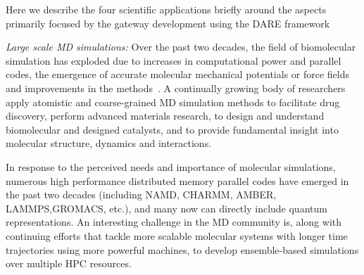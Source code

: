 \documentclass{sig-alternate}
\begin{document}
Here we describe the four scientific applications briefly around the
aspects primarily focused by the gateway development using the DARE
framework

\textit{Large scale MD simulations:} Over the past two
decades, the field of biomolecular simulation has exploded due to
increases in computational power and parallel codes, the emergence of
accurate molecular mechanical potentials or force fields and
improvements in the methods~\cite{amber,mackerell2008,adcock2006}. A
continually growing body of researchers apply atomistic and
coarse-grained MD simulation methods to
facilitate drug discovery, perform advanced materials research, to
design and understand biomolecular and designed catalysts, and to
provide fundamental insight into molecular structure, dynamics and
interactions.


In response to the perceived needs and importance of molecular
simulations, numerous high performance distributed memory parallel
codes have emerged in the past two decades (including NAMD, CHARMM,
AMBER, LAMMPS,GROMACS, etc.), and many now can directly include
quantum representations.  An interesting challenge in the MD community
is, along with continuing efforts that tackle more scalable molecular
systems with longer time trajectories using more powerful machines, to
develop ensemble-based simulations over multiple HPC resources.
\end{document}
